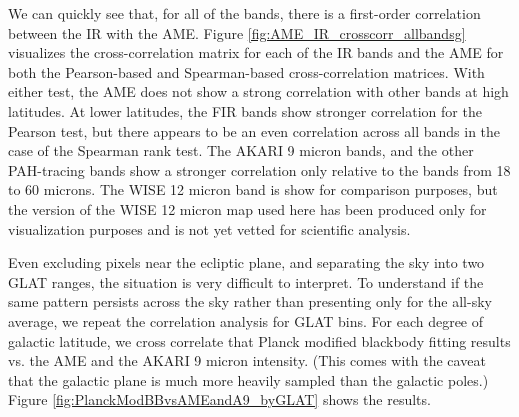\documentclass[preprint2,longabstract]{aastex}
\begin{document}
    We can quickly see that, for all of the bands, there is a first-order correlation between the IR with the AME. Figure \ref{fig:AME_IR_crosscorr_allbandsg} visualizes the cross-correlation matrix for each of the IR bands and the AME for both the Pearson-based and Spearman-based cross-correlation matrices. With either test, the AME does not show a strong correlation with other bands at high latitudes. At lower latitudes, the FIR bands show stronger correlation for the Pearson test, but there appears to be an even correlation across all bands in the case of the Spearman rank test. The AKARI 9 micron bands, and the other PAH-tracing bands show a stronger correlation only relative to the bands from 18 to 60 microns. The WISE 12 micron band is show for comparison purposes, but the version of the WISE 12 micron map used here has been produced only for visualization purposes and is not yet vetted for scientific analysis.

    Even excluding pixels near the ecliptic plane, and separating the sky into two GLAT ranges, the situation is very difficult to interpret. To understand if the same pattern persists across the sky rather than presenting only for the all-sky average, we repeat the correlation analysis for GLAT bins. For each degree of galactic latitude, we cross correlate that Planck modified blackbody fitting results vs. the AME and the AKARI 9 micron intensity. (This comes with the caveat that the galactic plane is much more heavily sampled than the galactic poles.) Figure \ref{fig:PlanckModBBvsAMEandA9_byGLAT} shows the results.



\end{document}
